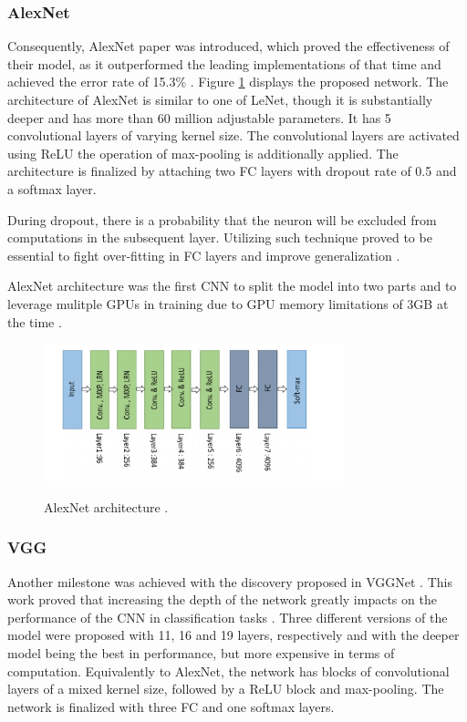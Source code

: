 \subsubsection{AlexNet}
\label{alexnet_section} 
Consequently, AlexNet paper was introduced, which proved the effectiveness of their model, as it outperformed the leading implementations of that time and achieved the error rate of 15.3\% \cite{NIPS2012_c399862d}. Figure \ref{AlexNet} displays the proposed network. The architecture of AlexNet is similar to one of LeNet, though it is substantially deeper and has more than 60 million adjustable parameters. It has 5 convolutional layers of varying kernel size. The convolutional layers are activated using ReLU the operation of max-pooling is additionally applied. The architecture is finalized by attaching two FC layers with dropout rate of 0.5 and a softmax layer.

During dropout, there is a probability that the neuron will be excluded from computations in the subsequent layer. Utilizing such technique proved to be essential to fight over-fitting in FC layers and improve generalization  \cite{JMLR:v15:srivastava14a}. 

AlexNet architecture was the first CNN to split the model into two parts and to leverage mulitple GPUs in training due to GPU memory limitations of 3GB at the time \cite{NIPS2012_c399862d}. 

\begin{figure}[htb]
	\begin{center}
		\includegraphics[height=4cm]{./AlexNet.png}
	\end{center}
	\caption{AlexNet architecture \cite{alom01}.}
	\begin{center}
		\label{AlexNet}
	\end{center}
\end{figure}
\FloatBarrier

\subsubsection{VGG}
Another milestone was achieved with the discovery proposed in VGGNet \cite{Simonyan2014}. This work proved that increasing the depth of the network greatly impacts on the performance of the CNN in classification tasks \cite{alom01}. Three different versions of the model were proposed with 11, 16 and 19 layers, respectively and with the deeper model being the best in performance, but more expensive in terms of computation. Equivalently to AlexNet, the network has blocks of convolutional layers of a mixed kernel size, followed by a ReLU block and max-pooling. The network is finalized with three FC and one softmax layers. 

